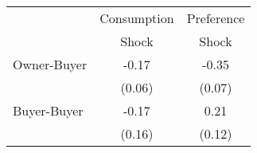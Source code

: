 \begin{tabular}{lcc}
& Consumption & Preference  \\
& Shock & Shock \\
Owner-Buyer &-0.17&-0.35\\
  & (0.06) & (0.07) \\
Buyer-Buyer &-0.17&0.21\\
 & (0.16) & (0.12) \\
\end{tabular}
